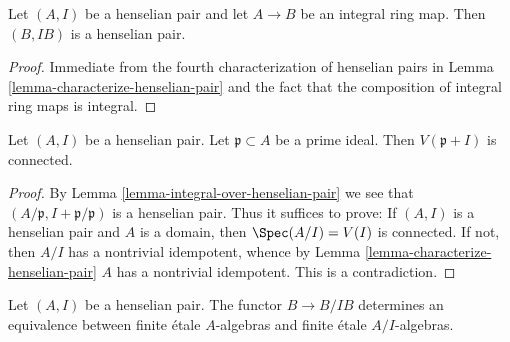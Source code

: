 \begin{lemma}
\label{lemma-integral-over-henselian-pair}
Let $(A, I)$ be a henselian pair and let $A \to B$ be an integral ring
map. Then $(B, IB)$ is a henselian pair.
\end{lemma}

\begin{proof}
Immediate from the fourth characterization of henselian pairs in
Lemma \ref{lemma-characterize-henselian-pair} and the fact that the
composition of integral ring maps is integral.
\end{proof}

\begin{lemma}
\label{lemma-irreducible-henselian-pair-connected}
Let $(A, I)$ be a henselian pair. Let $\mathfrak p \subset A$
be a prime ideal. Then $V(\mathfrak p + I)$ is connected.
\end{lemma}

\begin{proof}
By Lemma \ref{lemma-integral-over-henselian-pair} we see that
$(A/\mathfrak p, I + \mathfrak p/\mathfrak p)$ is a henselian pair.
Thus it suffices to prove: If $(A, I)$ is a henselian pair and
$A$ is a domain, then $\Spec(A/I) = V(I)$ is connected. If not,
then $A/I$ has a nontrivial idempotent, whence by
Lemma \ref{lemma-characterize-henselian-pair}
$A$ has a nontrivial idempotent. This is a contradiction.
\end{proof}

\begin{lemma}
\label{lemma-finite-etale-equivalence}
Let $(A, I)$ be a henselian pair. The functor $B \to B/IB$ determines
an equivalence between finite \'etale $A$-algebras and finite \'etale
$A/I$-algebras.
\end{lemma}


